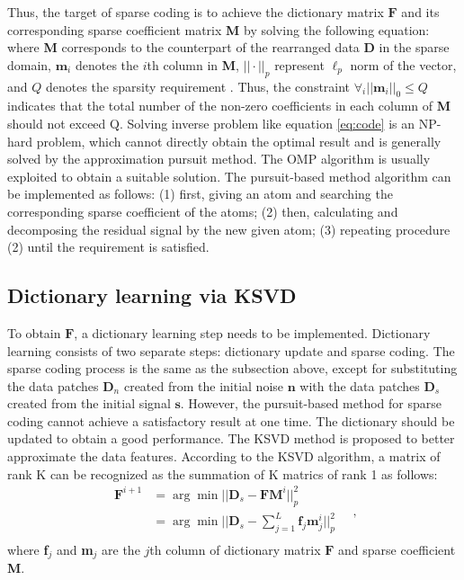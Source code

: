 Thus, the target of sparse coding is to achieve the dictionary matrix $\mathbf{F}$ and its corresponding sparse coefficient matrix \textbf{M} by solving the following equation:
where \textbf{M} corresponds to the counterpart of the rearranged data \textbf{D} in the sparse domain, $\mathbf{m}_i$ denotes the $i$th column in \textbf{M}, $||\cdot||_p$ represent $\ell_{p}$ norm of the vector, and $Q$ denotes the sparsity requirement . Thus, the constraint $\forall_i ||\textbf{m}_i||_{0}\le Q$ indicates that the total number of the non-zero coefficients in each column of \textbf{M} should not exceed Q. Solving inverse problem like equation \ref{eq:code} is an NP-hard problem, which cannot directly obtain the optimal result and is generally solved by the approximation pursuit method. The OMP algorithm is usually exploited to obtain a suitable solution. The pursuit-based method algorithm can be implemented as follows: (1) first, giving an atom and searching the corresponding sparse coefficient of the atoms; (2) then, calculating and decomposing the residual signal by the new given atom; (3) repeating procedure (2) until the requirement is satisfied. 


\subsection{Dictionary learning via KSVD}
To obtain $\mathbf{F}$, a dictionary learning step needs to be implemented. Dictionary learning consists of two separate steps: dictionary update and sparse coding. The sparse coding process is the same as the subsection above, except for substituting the data patches $\textbf{D}_{n}$ created from the initial noise $\mathbf{n}$ with the data patches $\textbf{D}_{s}$ created from the initial signal $\mathbf{s}$. However, the pursuit-based method for sparse coding cannot achieve a satisfactory result at one time. The dictionary should be updated to obtain a good performance. The KSVD method is proposed to better approximate the data features. According to the KSVD algorithm, a matrix of rank K can be recognized as the summation of K matrics of rank 1 as follows:
\begin{equation}
\begin{split}
\mathbf{F}^{i+1}&=\arg\min||\textbf{D}_s-\mathbf{F}\textbf{M}^{i}||^{2}_{p}\\
&=\arg\min||\textbf{D}_{s}-\sum_{j=1}^{L}\textbf{f}_{j}\textbf{m}^{i}_{j}||^{2}_{p}\\
\end{split}\quad,
\end{equation}
where \textbf{f}$_{j}$ and \textbf{m}$_{j}$ are the $j$th column of dictionary matrix $\mathbf{F}$ and sparse coefficient \textbf{M}. 

